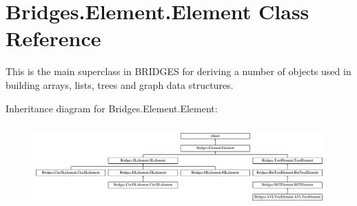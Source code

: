 \hypertarget{class_bridges_1_1_element_1_1_element}{}\section{Bridges.\+Element.\+Element Class Reference}
\label{class_bridges_1_1_element_1_1_element}


This is the main superclass in B\+R\+I\+D\+G\+ES for deriving a number of objects used in building arrays, lists, trees and graph data structures.  


Inheritance diagram for Bridges.\+Element.\+Element\+:\begin{figure}[H]
\begin{center}
\leavevmode
\includegraphics[height=3.218391cm]{class_bridges_1_1_element_1_1_element}
\end{center}
\end{figure}
